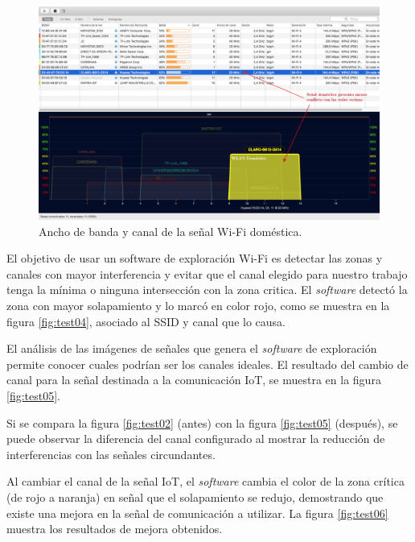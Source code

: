 \begin{landscape} %
\begin{figure}[htpb]
\centering 
\includegraphics[width=1.5\textwidth]{./Figures/wifi/03.png}
\caption{Ancho de banda  y canal de la señal Wi-Fi doméstica.}
\label{fig:test03}
\end{figure}
\end{landscape} %

El objetivo de usar un software de exploración Wi-Fi es detectar las zonas y canales con mayor interferencia y evitar que el canal elegido para nuestro trabajo tenga la mínima o ninguna intersección con la zona critica. El \emph{software} detectó la zona con mayor solapamiento y lo marcó en color rojo, como se muestra en la figura \ref{fig:test04}, asociado al SSID y canal que lo causa.

El análisis de las imágenes de señales que genera el \emph{software} de exploración permite conocer cuales podrían ser los canales ideales. El resultado del cambio de canal para la señal destinada a la comunicación IoT, se muestra en la figura \ref{fig:test05}. 

Si se compara la figura \ref{fig:test02} (antes) con la figura \ref{fig:test05} (después), se puede observar la diferencia del canal configurado al mostrar la reducción de interferencias con las señales circundantes.

Al cambiar el canal de la señal IoT, el \emph{software} cambia el color de la zona crítica (de rojo a naranja) en señal que el solapamiento se redujo, demostrando que existe una mejora en la señal de comunicación a utilizar. La figura \ref{fig:test06} muestra los resultados de mejora obtenidos.

